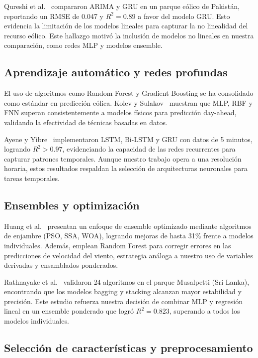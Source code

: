 \documentclass[conference]{IEEEtran}
\begin{document}
	Qureshi et al.~\cite{qureshi2023shortterm} compararon ARIMA y GRU en un parque eólico de Pakistán, reportando un RMSE de 0.047 y \(R^2 = 0.89\) a favor del modelo GRU. Esto evidencia la limitación de los modelos lineales para capturar la no linealidad del recurso eólico. Este hallazgo motivó la inclusión de modelos no lineales en nuestra comparación, como redes MLP y modelos ensemble.
	
	\subsection{Aprendizaje automático y redes profundas}
	
	El uso de algoritmos como Random Forest y Gradient Boosting se ha consolidado como estándar en predicción eólica. Kolev y Sulakov~\cite{kolev2019forecasting} muestran que MLP, RBF y FNN superan consistentemente a modelos físicos para predicción day-ahead, validando la efectividad de técnicas basadas en datos.
	
	Ayene y Yibre~\cite{ayene2024wind} implementaron LSTM, Bi-LSTM y GRU con datos de 5 minutos, logrando \(R^2 > 0.97\), evidenciando la capacidad de las redes recurrentes para capturar patrones temporales. Aunque nuestro trabajo opera a una resolución horaria, estos resultados respaldan la selección de arquitecturas neuronales para tareas temporales.
	
	\subsection{Ensembles y optimización}
	
	Huang et al.~\cite{huang2023ensemble} presentan un enfoque de ensemble optimizado mediante algoritmos de enjambre (PSO, SSA, WOA), logrando mejoras de hasta 31\% frente a modelos individuales. Además, emplean Random Forest para corregir errores en las predicciones de velocidad del viento, estrategia análoga a nuestro uso de variables derivadas y ensamblados ponderados.
	
	Rathnayake et al.~\cite{rathnayake2025predicting} validaron 24 algoritmos en el parque Musalpetti (Sri Lanka), encontrando que los modelos bagging y stacking alcanzan mayor estabilidad y precisión. Este estudio refuerza nuestra decisión de combinar MLP y regresión lineal en un ensemble ponderado que logró \(R^2 = 0.823\), superando a todos los modelos individuales.
	
	\subsection{Selección de características y preprocesamiento}
	
\end{document}
